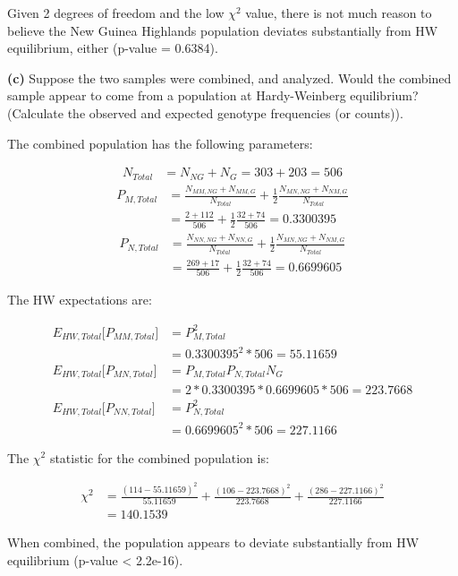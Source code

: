 \documentclass{essay}
\begin{document}
\begin{essaystyle}
Given 2 degrees of freedom and the low $\chi^2$ value, there is not much reason
to believe the New Guinea Highlands population deviates substantially from HW
equilibrium, either (p-value = 0.6384).


\textbf{(c)} Suppose the two samples were combined, and analyzed. Would the
combined sample appear to come from a population at Hardy-Weinberg equilibrium?
(Calculate the observed and expected genotype frequencies (or counts)).

The combined population has the following parameters:

\begin{align}
N_{Total} &= N_{NG} + N_G = 303 + 203 = 506
\end{align}
\begin{align}
  P_{M,Total} &= \frac{N_{MM,NG} + N_{MM,G}}{N_{Total}} + \frac{1}{2}\frac{N_{MN,NG}+N_{NM,G}}{N_{Total}} \\
  &= \frac{2+112}{506} + \frac{1}{2}\frac{32+74}{506} = 0.3300395
\end{align}
\begin{align}
  P_{N,Total} &= \frac{N_{NN,NG} + N_{NN,G}}{N_{Total}} + \frac{1}{2}\frac{N_{MN,NG}+N_{NM,G}}{N_{Total}} \\
  &= \frac{269+17}{506} + \frac{1}{2}\frac{32+74}{506} = 0.6699605
\end{align}

The HW expectations are:

\begin{align}
  E_{HW,Total}\big[P_{MM,Total}\big] &= P_{M,Total}^2 \\
  &= 0.3300395^2 *506 = 55.11659 \\
  E_{HW,Total}\big[P_{MN,Total}\big] &= P_{M,Total}P_{N,Total}N_{G} \\
  &= 2*0.3300395*0.6699605*506 = 223.7668 \\
  E_{HW,Total}\big[P_{NN,Total}\big] &= P_{N,Total}^2 \\
  &= 0.6699605^2 *506 = 227.1166
\end{align}

The $\chi^2$ statistic for the combined population is:

\begin{align}
  \chi^2 &= \frac{(114-55.11659)^2}{55.11659} + \frac{(106-223.7668)^2}{223.7668} + \frac{(286 - 227.1166)^2}{227.1166} \\
  &= 140.1539
\end{align}

When combined, the population appears to deviate substantially from HW
equilibrium (p-value < 2.2e-16).



\end{essaystyle}
\end{document}
